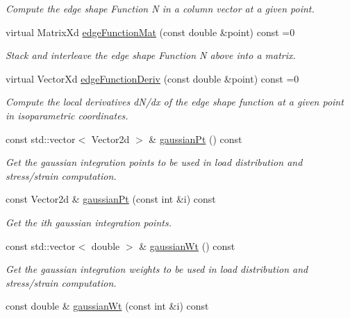 \begin{DoxyCompactItemize}
\begin{DoxyCompactList}\small\item\em Compute the edge shape Function N in a column vector at a given point. \end{DoxyCompactList}\item 
virtual Matrix\+Xd \mbox{\hyperlink{class_shape_ac9854f15377ea07c97be16049e3058d5}{edge\+Function\+Mat}} (const double \&point) const =0
\begin{DoxyCompactList}\small\item\em Stack and interleave the edge shape Function N above into a matrix. \end{DoxyCompactList}\item 
virtual Vector\+Xd \mbox{\hyperlink{class_shape_a652164292592de3157eb4021f43c9305}{edge\+Function\+Deriv}} (const double \&point) const =0
\begin{DoxyCompactList}\small\item\em Compute the local derivatives d\+N/dx of the edge shape function at a given point in isoparametric coordinates. \end{DoxyCompactList}\item 
const std\+::vector$<$ Vector2d $>$ \& \mbox{\hyperlink{class_shape_a8d53e88ab51926dc57177c56c3fde714}{gaussian\+Pt}} () const
\begin{DoxyCompactList}\small\item\em Get the gaussian integration points to be used in load distribution and stress/strain computation. \end{DoxyCompactList}\item 
const Vector2d \& \mbox{\hyperlink{class_shape_a66cd2cc62229a4757a5d0eeeb36197de}{gaussian\+Pt}} (const int \&i) const
\begin{DoxyCompactList}\small\item\em Get the ith gaussian integration points. \end{DoxyCompactList}\item 
const std\+::vector$<$ double $>$ \& \mbox{\hyperlink{class_shape_aa6112974b77db75f70e5a7367d30ed78}{gaussian\+Wt}} () const
\begin{DoxyCompactList}\small\item\em Get the gaussian integration weights to be used in load distribution and stress/strain computation. \end{DoxyCompactList}\item 
const double \& \mbox{\hyperlink{class_shape_ab59598c42a7ecbe41998820bf43e1307}{gaussian\+Wt}} (const int \&i) const

\end{DoxyCompactItemize}
